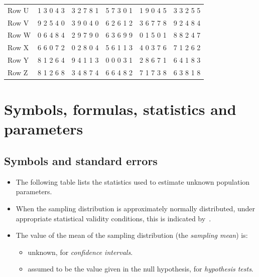 \documentclass[
  11pt,
  a4paper,
  krantz2]{krantz}
\providecommand{\tightlist}{%
  \setlength{\itemsep}{0pt}\setlength{\parskip}{0pt}}
\begin{document}
\begin{table}
\begin{tabular}[t]{llllll}
\addlinespace
Row U & 1 3 0 4 3 & 3 2 7 8 1 & 5 7 3 0 1 & 1 9 0 4 5 & 3 3 2 5 5\\
Row V & 9 2 5 4 0 & 3 9 0 4 0 & 6 2 6 1 2 & 3 6 7 7 8 & 9 2 4 8 4\\
Row W & 0 6 4 8 4 & 2 9 7 9 0 & 6 3 6 9 9 & 0 1 5 0 1 & 8 8 2 4 7\\
Row X & 6 6 0 7 2 & 0 2 8 0 4 & 5 6 1 1 3 & 4 0 3 7 6 & 7 1 2 6 2\\
Row Y & 8 1 2 6 4 & 9 4 1 1 3 & 0 0 0 3 1 & 2 8 6 7 1 & 6 4 1 8 3\\
\addlinespace
Row Z & 8 1 2 6 8 & 3 4 8 7 4 & 6 6 4 8 2 & 7 1 7 3 8 & 6 3 8 1 8\\
\bottomrule
\end{tabular}
\end{table}

\chapter{Symbols, formulas, statistics and parameters}\label{StatisticsAndParameters}

\section{Symbols and standard errors}\label{Symbols}

\begin{itemize}
\item
  The following table lists the statistics used to estimate unknown population parameters. \tightlist
\item
  When the sampling distribution is approximately normally distributed, under appropriate statistical validity conditions, this is indicated by~.
\item
  The value of the mean of the sampling distribution (the \emph{sampling mean}) is:

  \begin{itemize}
  \tightlist
  \item
    unknown, for \emph{confidence intervals}.
  \item
    assumed to be the value given in the null hypothesis, for \emph{hypothesis tests}.
  \end{itemize}
\end{itemize}
\end{document}
